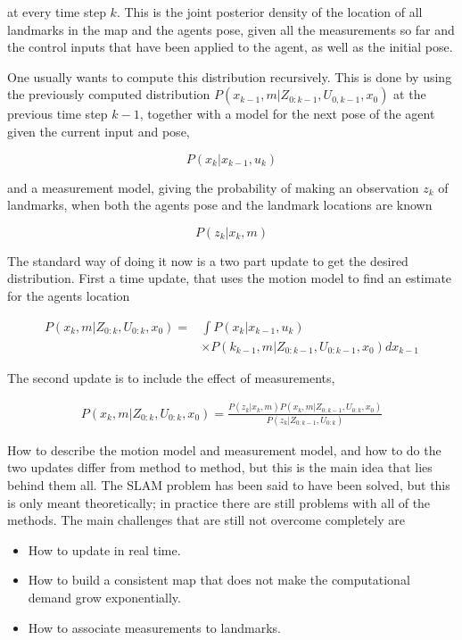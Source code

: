 at every time step $k$. This is the joint posterior density of the location of all landmarks in the map and the agents pose, given all the measurements so far and the control inputs that have been applied to the agent, as well as the initial pose. 

One usually wants to compute this distribution recursively. This is done by using the previously computed distribution $P(x_{k-1},m|Z_{0:k-1},U_{0,k-1},x_0)$ at the previous time step $k-1$, together with a model for the next pose of the agent given the current input and pose, 

\begin{equation}
    P(x_k|x_{k-1},u_k)
\end{equation}

and a measurement model, giving the probability of making an observation $z_k$ of landmarks, when both the agents pose and the landmark locations are known

\begin{equation}
    P(z_k|x_k,m)
\end{equation}

The standard way of doing it now is a two part update to get the desired distribution. First a time update, that uses the motion model to find an estimate for the agents location


\begin{align}
    P(x_k,m|Z_{0:k},U_{0:k}, x_0) 
     = & \int P(x_k|x_{k-1},u_k) \\
    & \times P(k_{k-1},m|Z_{0:k-1},U_{0:k-1},x_0)dx_{k-1}
\end{align}

The second update is to include the effect of measurements, 

\begin{equation}
\begin{split}
    P(x_k,m|Z_{0:k},U_{0:k},x_0) 
    = \frac{P(z_k|x_k,m)P(x_k,m|Z_{0:k-1},U_{0:k},x_0)}{P(z_k|Z_{0:k-1},U_{0:k})}
\end{split}
\end{equation}

How to describe the motion model and measurement model, and how to do the two updates differ from method to method, but this is the main idea that lies behind them all. The SLAM problem has been said to have been solved, but this is only meant theoretically; in practice there are still problems with all of the methods. The main challenges that are still not overcome completely are 

\begin{itemize}
    \item How to update in real time.
    \item How to build a consistent map that does not make the computational demand grow exponentially.
    \item How to associate measurements to landmarks.
\end{itemize}

